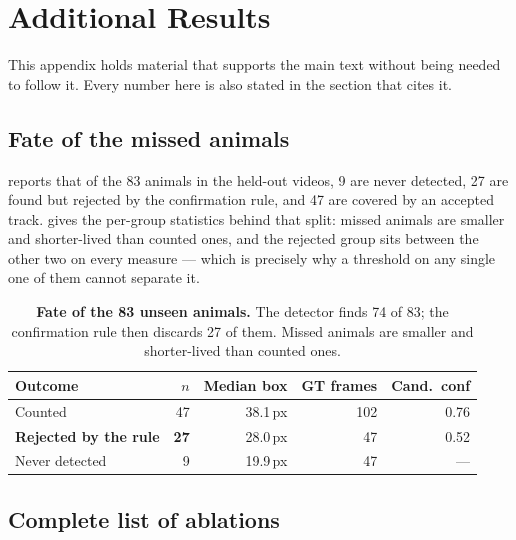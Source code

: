 \clearpage
\appendix
\section{Additional Results}
\label{sec:appendix}

This appendix holds material that supports the main text without being needed to follow it.
Every number here is also stated in the section that cites it.

\subsection{Fate of the missed animals}

 reports that of the 83 animals in the held-out videos, 9 are never
detected, 27 are found but rejected by the confirmation rule, and 47 are covered by an
accepted track.  gives the per-group statistics behind that split: missed
animals are smaller and shorter-lived than counted ones, and the rejected group sits between
the other two on every measure --- which is precisely why a threshold on any single one of
them cannot separate it.

\begin{table}[t]
\centering\small
\begin{tabular}{lrrrr}
\toprule
Outcome & $n$ & Median box & GT frames & Cand.\ conf \\
\midrule
Counted & 47 & 38.1\,px & 102 & 0.76 \\
\textbf{Rejected by the rule} & \textbf{27} & 28.0\,px & 47 & 0.52 \\
Never detected & 9 & 19.9\,px & 47 & --- \\
\bottomrule
\end{tabular}
\caption{\textbf{Fate of the 83 unseen animals.} The detector finds 74 of 83; the
confirmation rule then discards 27 of them. Missed animals are smaller and shorter-lived
than counted ones.}
\label{tab:missed}
\end{table}

\subsection{Complete list of ablations}

